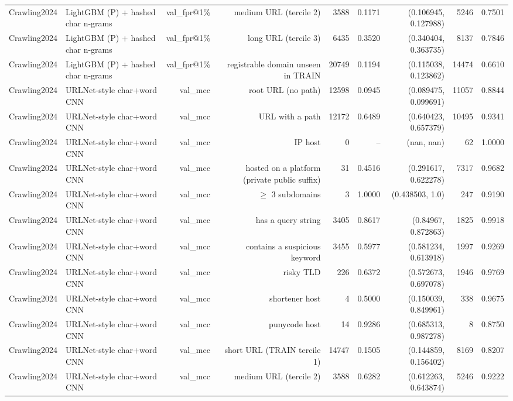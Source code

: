 \begin{table}[t]
\begin{tabular}{llrrrrrrr}
Crawling2024 & LightGBM (P) + hashed char n-grams & val\_fpr@1\% & medium URL (tercile 2) & 3588 & 0.1171 & (0.106945, 0.127988) & 5246 & 0.7501 \\
Crawling2024 & LightGBM (P) + hashed char n-grams & val\_fpr@1\% & long URL (tercile 3) & 6435 & 0.3520 & (0.340404, 0.363735) & 8137 & 0.7846 \\
Crawling2024 & LightGBM (P) + hashed char n-grams & val\_fpr@1\% & registrable domain unseen in TRAIN & 20749 & 0.1194 & (0.115038, 0.123862) & 14474 & 0.6610 \\
Crawling2024 & URLNet-style char+word CNN & val\_mcc & root URL (no path) & 12598 & 0.0945 & (0.089475, 0.099691) & 11057 & 0.8844 \\
Crawling2024 & URLNet-style char+word CNN & val\_mcc & URL with a path & 12172 & 0.6489 & (0.640423, 0.657379) & 10495 & 0.9341 \\
Crawling2024 & URLNet-style char+word CNN & val\_mcc & IP host & 0 & -- & (nan, nan) & 62 & 1.0000 \\
Crawling2024 & URLNet-style char+word CNN & val\_mcc & hosted on a platform (private public suffix) & 31 & 0.4516 & (0.291617, 0.622278) & 7317 & 0.9682 \\
Crawling2024 & URLNet-style char+word CNN & val\_mcc & $\geq$ 3 subdomains & 3 & 1.0000 & (0.438503, 1.0) & 247 & 0.9190 \\
Crawling2024 & URLNet-style char+word CNN & val\_mcc & has a query string & 3405 & 0.8617 & (0.84967, 0.872863) & 1825 & 0.9918 \\
Crawling2024 & URLNet-style char+word CNN & val\_mcc & contains a suspicious keyword & 3455 & 0.5977 & (0.581234, 0.613918) & 1997 & 0.9269 \\
Crawling2024 & URLNet-style char+word CNN & val\_mcc & risky TLD & 226 & 0.6372 & (0.572673, 0.697078) & 1946 & 0.9769 \\
Crawling2024 & URLNet-style char+word CNN & val\_mcc & shortener host & 4 & 0.5000 & (0.150039, 0.849961) & 338 & 0.9675 \\
Crawling2024 & URLNet-style char+word CNN & val\_mcc & punycode host & 14 & 0.9286 & (0.685313, 0.987278) & 8 & 0.8750 \\
Crawling2024 & URLNet-style char+word CNN & val\_mcc & short URL (TRAIN tercile 1) & 14747 & 0.1505 & (0.144859, 0.156402) & 8169 & 0.8207 \\
Crawling2024 & URLNet-style char+word CNN & val\_mcc & medium URL (tercile 2) & 3588 & 0.6282 & (0.612263, 0.643874) & 5246 & 0.9222 \\

\end{tabular}
\end{table}
